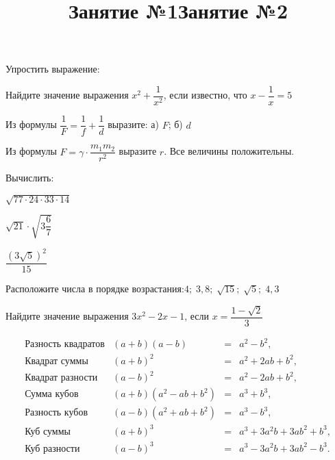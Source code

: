 \title{Занятие №1}
\begin{listofex}
	\item Упростить выражение:
	\begin{enumcols}[itemcolumns=2]
		\item {}
		\item {}
		\item {}
		\item {}
		\item {}
		\item {}
	\end{enumcols}
	
	\item {}
	\item {}
	\item Найдите значение выражения \( x^2+\dfrac{1}{x^2} \), если известно, что \( x-\dfrac{1}{x}=5 \)
	\item Из формулы \( \dfrac{1}{F}=\dfrac{1}{f}+\dfrac{1}{d} \) выразите: а) \( F \); б) \( d \)
	\item Из формулы \( F=\gamma\cdot\dfrac{m_1m_2}{r^2} \) выразите \( r \). Все величины положительны.
	\item Вычислить:
	\begin{enumcols}[itemcolumns=3]
		\item \( \sqrt{77\cdot24\cdot33\cdot14} \)
		\item \( \sqrt{21}\cdot\sqrt{3\dfrac{6}{7}} \)
		\item \( \dfrac{(3\sqrt{5})^2}{15} \)
	\end{enumcols}
	\item Расположите числа в порядке возрастания:\quad\( 4;\;3,8;\;\sqrt{15};\;\sqrt{5};\;4,3 \)
	\item Найдите значение выражения \( 3x^2-2x-1 \), если \( x=\dfrac{1-\sqrt{2}}{3} \)
	
\end{listofex}
\newpage
\title{Занятие №2}
\[ \begin{array}{cccc}
	\text{Разность квадратов}&(a+b)(a-b)& =&a^2-b^2,\\
	\text{Квадрат суммы}&(a+b)^2& =&a^2+2ab+b^2,\\
	\text{Квадрат разности}&(a-b)^2& =&a^2-2ab+b^2,\\
	\text{Сумма кубов}&(a+b)(a^2-ab+b^2)& =&a^3+b^3,\\
	\text{Разность кубов}&(a-b)(a^2+ab+b^2)& =&a^3-b^3,\\
	\text{Куб суммы}&(a+b)^3& =&a^3+3a^2b+3ab^2+b^3,\\
	\text{Куб разности}&(a-b)^3& =&a^3-3a^2b+3ab^2-b^3.\\
\end{array} \]

